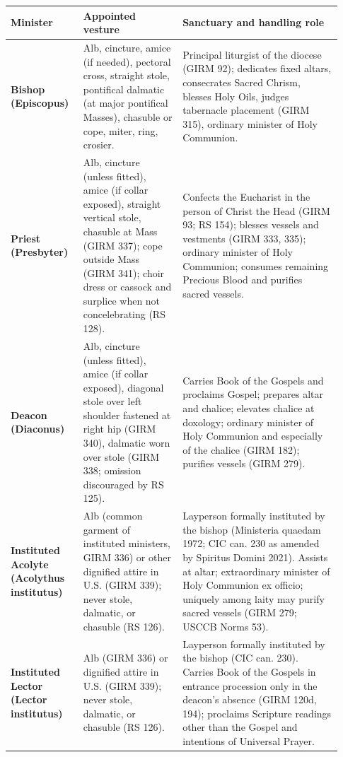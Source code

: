 {\footnotesize\begin{longtable}{>{\raggedright\arraybackslash}p{0.20\linewidth}>{\raggedright\arraybackslash}p{0.28\linewidth}>{\raggedright\arraybackslash}p{0.45\linewidth}}
\toprule
\textbf{Minister} & \textbf{Appointed vesture} & \textbf{Sanctuary and handling role} \\
\midrule
\endhead
\textbf{Bishop (Episcopus)} & Alb, cincture, amice (if needed), pectoral cross, straight stole, pontifical dalmatic (at major pontifical Masses), chasuble or cope, miter, ring, crosier. & Principal liturgist of the diocese (GIRM 92); dedicates fixed altars, consecrates Sacred Chrism, blesses Holy Oils, judges tabernacle placement (GIRM 315), ordinary minister of Holy Communion. \\
\textbf{Priest (Presbyter)} & Alb, cincture (unless fitted), amice (if collar exposed), straight vertical stole, chasuble at Mass (GIRM 337); cope outside Mass (GIRM 341); choir dress or cassock and surplice when not concelebrating (RS 128). & Confects the Eucharist in the person of Christ the Head (GIRM 93; RS 154); blesses vessels and vestments (GIRM 333, 335); ordinary minister of Holy Communion; consumes remaining Precious Blood and purifies sacred vessels. \\
\textbf{Deacon (Diaconus)} & Alb, cincture (unless fitted), amice (if collar exposed), diagonal stole over left shoulder fastened at right hip (GIRM 340), dalmatic worn over stole (GIRM 338; omission discouraged by RS 125). & Carries Book of the Gospels and proclaims Gospel; prepares altar and chalice; elevates chalice at doxology; ordinary minister of Holy Communion and especially of the chalice (GIRM 182); purifies vessels (GIRM 279). \\
\textbf{Instituted Acolyte (Acolythus institutus)} & Alb (common garment of instituted ministers, GIRM 336) or other dignified attire in U.S. (GIRM 339); never stole, dalmatic, or chasuble (RS 126). & Layperson formally instituted by the bishop (Ministeria quaedam 1972; CIC can. 230 as amended by Spiritus Domini 2021). Assists at altar; extraordinary minister of Holy Communion ex officio; uniquely among laity may purify sacred vessels (GIRM 279; USCCB Norms 53). \\
\textbf{Instituted Lector (Lector institutus)} & Alb (GIRM 336) or dignified attire in U.S. (GIRM 339); never stole, dalmatic, or chasuble (RS 126). & Layperson formally instituted by the bishop (CIC can. 230). Carries Book of the Gospels in entrance procession only in the deacon's absence (GIRM 120d, 194); proclaims Scripture readings other than the Gospel and intentions of Universal Prayer. \\

\end{longtable}}
